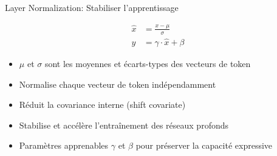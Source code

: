 \documentclass[aspectratio=169]{beamer}
\begin{document}
\begin{frame}{Layer Normalization: Stabiliser l'apprentissage}

    \begin{align*}
        \hat{x} &= \frac{x - \mu}{\sigma} \\
        y &= \gamma \cdot \hat{x} + \beta
    \end{align*}
    \begin{itemize}
        \item $\mu$ et $\sigma$ sont les moyennes et écarts-types des vecteurs de token
        \item Normalise chaque vecteur de token indépendamment
        \item Réduit la covariance interne (shift covariate)
        \item Stabilise et accélère l'entraînement des réseaux profonds
        \item Paramètres apprenables $\gamma$ et $\beta$ pour préserver la capacité expressive
    \end{itemize}
\end{frame}
\end{document}
